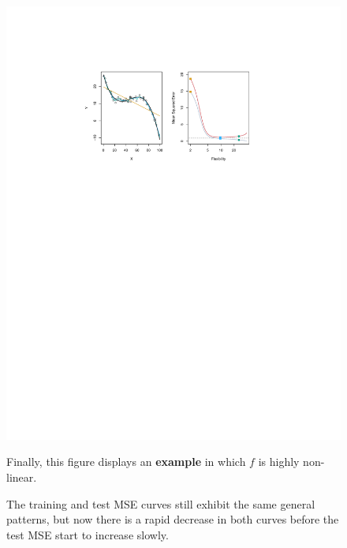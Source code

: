 \documentclass[a4paper]{article}
\newcommand{\example}[1]{\textcolor{Green4}{\textbf{#1}}}
\newcommand{\highspace}{\vspace{1.2em}\noindent}
\begin{document}
    \begin{figure}[!htp]
        \begin{examplebox}
            \begin{center}
                \includegraphics[width=\textwidth]{img/measuring-the-quality-of-fit-3.pdf}
                \label{fig: measuring the quality of fit - 3}
            \end{center}

            Finally, this figure displays an \example{example} in which $f$ is highly non-linear.

            \highspace
            The training and test MSE curves still exhibit the same general patterns, but now there is a rapid decrease in both curves before the test MSE start to increase slowly.
        \end{examplebox}
    \end{figure}
    
\end{document}
